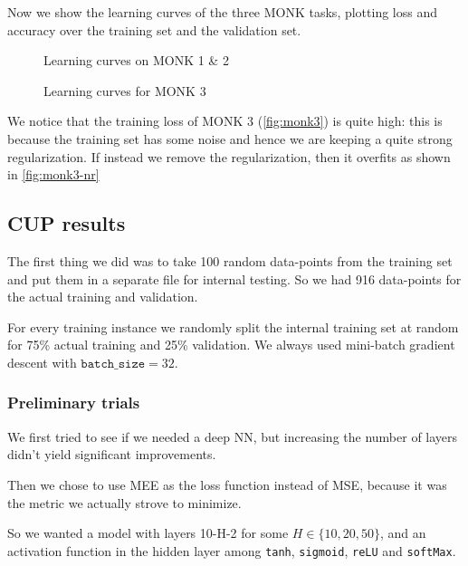 Now we show the learning curves of the three MONK tasks, plotting loss and accuracy over the training set and the validation set.

\begin{figure}
    \centering
    \caption{Learning curves on MONK 1 \& 2}
    \label{fig:monk12}
\end{figure}

\begin{figure}
    \centering    {}
    \caption{Learning curves for MONK 3}
\end{figure}

We notice that the training loss of MONK 3 (\cref{fig:monk3}) is quite high: this is because the training set has some noise and hence we are keeping a quite strong regularization.
If instead we remove the regularization, then it overfits as shown in \cref{fig:monk3-nr}

\clearpage

\subsection{CUP results}

The first thing we did was to take 100 random data-points from the training set and put them in a separate file for internal testing. So we had 916 data-points for the actual training and validation.

For every training instance we randomly split the internal training set at random for 75\% actual training and 25\% validation. We always used mini-batch gradient descent with $\texttt{batch\_size}=32$.


\subsubsection{Preliminary trials}

We first tried to see if we needed a deep NN, but increasing the number of layers didn't yield significant improvements.

Then we chose to use MEE as the loss function instead of MSE, because it was the metric we actually strove to minimize.

So we wanted a model with layers 10-H-2 for some $H\in\{ 10, 20, 50 \}$, and an activation function in the hidden layer among \texttt{tanh}, \texttt{sigmoid}, \texttt{reLU} and \texttt{softMax}.

